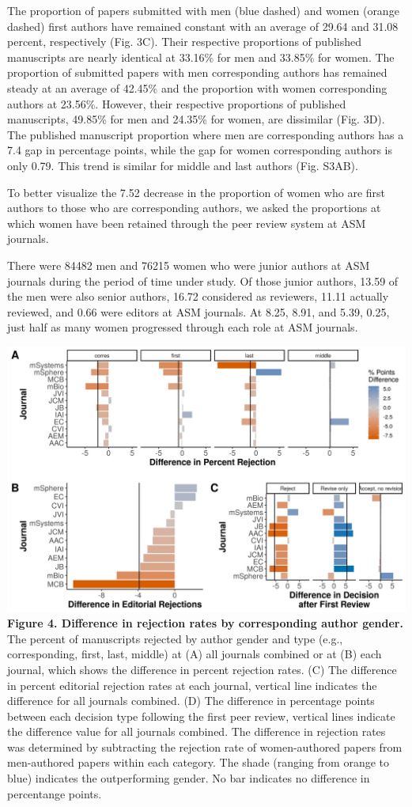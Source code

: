 \documentclass[11pt,]{article}
\begin{document}
The proportion of papers submitted with men (blue dashed) and women
(orange dashed) first authors have remained constant with an average of
29.64 and 31.08 percent, respectively (Fig. 3C). Their respective
proportions of published manuscripts are nearly identical at 33.16\% for
men and 33.85\% for women. The proportion of submitted papers with men
corresponding authors has remained steady at an average of 42.45\% and
the proportion with women corresponding authors at 23.56\%. However,
their respective proportions of published manuscripts, 49.85\% for men
and 24.35\% for women, are dissimilar (Fig. 3D). The published
manuscript proportion where men are corresponding authors has a 7.4 gap
in percentage points, while the gap for women corresponding authors is
only 0.79. This trend is similar for middle and last authors (Fig.
S3AB).

To better visualize the 7.52 decrease in the proportion of women who are
first authors to those who are corresponding authors, we asked the
proportions at which women have been retained through the peer review
system at ASM journals.

There were 84482 men and 76215 women who were junior authors at ASM
journals during the period of time under study. Of those junior authors,
13.59 of the men were also senior authors, 16.72 considered as
reviewers, 11.11 actually reviewed, and 0.66 were editors at ASM
journals. At 8.25, 8.91, and 5.39, 0.25, just half as many women
progressed through each role at ASM journals.

\includegraphics{Figure_4.png} \textbf{Figure 4. Difference in rejection
rates by corresponding author gender.} The percent of manuscripts
rejected by author gender and type (e.g., corresponding, first, last,
middle) at (A) all journals combined or at (B) each journal, which shows
the difference in percent rejection rates. (C) The difference in percent
editorial rejection rates at each journal, vertical line indicates the
difference for all journals combined. (D) The difference in percentage
points between each decision type following the first peer review,
vertical lines indicate the difference value for all journals combined.
The difference in rejection rates was determined by subtracting the
rejection rate of women-authored papers from men-authored papers within
each category. The shade (ranging from orange to blue) indicates the
outperforming gender. No bar indicates no difference in percentange
points.
\end{document}
